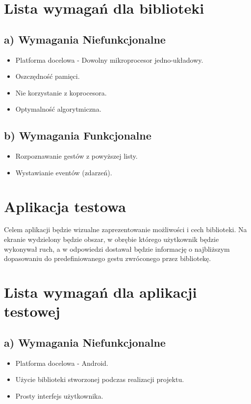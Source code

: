 \documentclass[a4paper,12pt]{article}
\begin{document}
\section{\Large Lista wymagań dla biblioteki}
	\subsection*{a) Wymagania Niefunkcjonalne}
	\begin{itemize}
		\item Platforma docelowa - Dowolny mikroprocesor jedno-układowy.
		\item Oszczędność pamięci.
		\item Nie korzystanie z koprocesora.
		\item Optymalność algorytmiczna.
	\end{itemize}
   		
	\subsection*{b) Wymagania Funkcjonalne}
	\begin{itemize}
		\item Rozpoznawanie gestów z powyższej listy.
		\item Wystawianie eventów (zdarzeń).
	\end{itemize}

\section{\Large Aplikacja testowa}
Celem aplikacji będzie wizualne zaprezentowanie możliwości i cech biblioteki. Na ekranie wydzielony będzie obszar, w obrębie którego użytkownik będzie wykonywał ruch, a w odpowiedzi dostawał będzie informację o najbliższym dopasowaniu do predefiniowanego gestu zwróconego przez bibliotekę.

\section{\Large Lista wymagań dla aplikacji testowej}
	\subsection*{a) Wymagania Niefunkcjonalne}
	\begin{itemize}
		\item Platforma docelowa - Android.
		\item Użycie biblioteki stworzonej podczas realizacji projektu.
		\item Prosty interfejs użytkownika.
	\end{itemize}
   		
\end{document}
